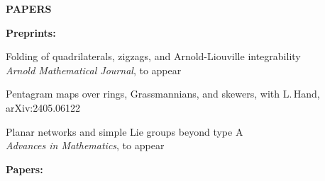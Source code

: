 \documentclass[a4paper, 12pt]{article}
\begin{document}
%
\textbf{PAPERS} \par\smallskip
 \textbf{Preprints:}
 \begin{compactenum}
 
 \item Folding of quadrilaterals, zigzags, and Arnold-Liouville integrability\\  	\textit{Arnold Mathematical Journal}, to appear 
   \item 	Pentagram maps over rings, Grassmannians, and skewers, with L.\,Hand, 	arXiv:2405.06122
 
 \item 	Planar networks and simple Lie groups beyond type A \\ \textit{Advances in Mathematics}, to appear
 





\end{compactenum}
 \par\smallskip
 \textbf{Papers:}
\end{document}
